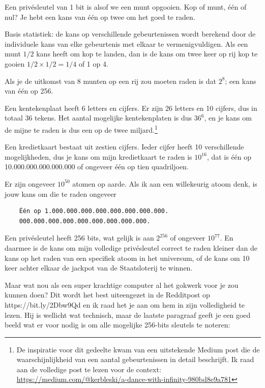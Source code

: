 \documentclass[smalldemyvopaper,11pt,twoside,onecolumn,openright,extrafontsizes]{memoir}
\begin{document}
Een privésleutel van 1 bit is alsof we een munt opgooien. Kop of munt, één of nul? Je hebt een kans van één op twee om het goed te raden.

Basis statistiek: de kans op verschillende gebeurtenissen wordt berekend door de individuele kans van elke gebeurtenis met elkaar te vermenigvuldigen. Als een munt $1/2$ kans heeft om kop te landen, dan is de kans om twee keer op rij kop te gooien $1/2 \times 1/2 = 1/4$ of 1 op 4.

Als je de uitkomst van 8 munten op een rij zou moeten raden is dat $2^{8}$; een kans van één op 256.

Een kentekenplaat heeft 6 letters en cijfers. Er zijn 26 letters en 10 cijfers, dus in totaal 36 tekens. Het aantal mogelijke kentekenplaten is dus $36^{6}$, en je kans om de mijne te raden is dus een op de twee miljard.\footnote{De inspiratie voor dit gedeelte kwam van een uitstekende Medium post die de waarschijnlijkheid van een aantal gebeurtenissen in detail beschrijft. Ik raad aan de volledige post te lezen voor de context: \href{https://medium.com/@kerbleski/a-dance-with-infinity-980bd8e9a781}{https://medium.com/@kerbleski/a-dance-with-infinity-980bd8e9a781}}

Een kredietkaart bestaat uit zestien cijfers. Ieder cijfer heeft 10 verschillende mogelijkheden, dus je kans om mijn kredietkaart te raden is $10^{16}$, dat is één op 10.000.000.000.000.000 of ongeveer één op tien quadriljoen.

Er zijn ongeveer $10^{50}$ atomen op aarde. Als ik aan een willekeurig atoom denk, is jouw kans om die te raden ongeveer

\begin{verbatim}
    Één op 1.000.000.000.000.000.000.000.000.
    000.000.000.000.000.000.000.000.000.
\end{verbatim}

Een privésleutel heeft 256 bits, wat gelijk is aan $2^{256}$ of ongeveer $10^{77}$. En daarmee is de kans om mijn volledige privésleutel correct te raden kleiner dan de kans op het raden van een specifiek atoom in het universum, of de kans om 10 keer achter elkaar de jackpot van de Staatsloterij te winnen.

Maar wat nou als een super krachtige computer al het gokwerk voor je zou kunnen doen? Dit wordt het best uiteengezet in de Redditpost op https://bit.ly/2Dbw9Qd en ik raad het je aan om hem in zijn volledigheid te lezen. Hij is wellicht wat technisch, maar de laatste paragraaf geeft je een goed beeld wat er voor nodig is om alle mogelijke 256-bits sleutels te noteren: 
\end{document}
